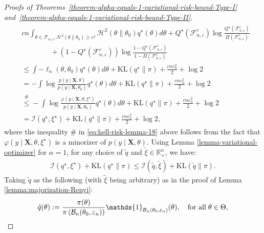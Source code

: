 \documentclass[12pt]{article}
\numberwithin{equation}{section}
\begin{document}
\begin{proof}[Proofs of Theorems~\ref{theorem-alpha-equals-1-variational-risk-bound-Type-I} and~\ref{theorem-alpha-equals-1-variational-risk-bound-Type-II}]
\begin{align}
\begin{split}
    &c n \int_{\theta \in \mathcal{F}_{n, \varepsilon}, \mathcal{H}^{2}(\theta \parallel \theta_0) \geq \varepsilon^2}\mathcal{H}^{2}(\theta\parallel \theta_0)q^{\star}(\theta)d\theta + Q^{\star}(\mathcal{F}_{n, \varepsilon}^{c})\log \frac{Q^{\star}(\mathcal{F}_{n, \varepsilon}^{c})}{\Pi(\mathcal{F}_{n, \varepsilon}^{c})}\\
    &\qquad \qquad + (1 - Q^{\star}(\mathcal{F}_{n, \varepsilon}^{c}))\log\frac{1 - Q^{\star}(\mathcal{F}_{n, \varepsilon}^{c})}{1 - \Pi(\mathcal{F}_{n, \varepsilon}^{c})}\\
    &\leq \int - \ell_{n}(\theta, \theta_0)q^{\star}(\theta)d\theta + \mathrm{KL}(q^{\star}\parallel \pi) + \frac{c n \varepsilon_n^2}{2} + \log 2\\
    &= -\int \log \frac{p(y\mid \mathbf{X}, \theta)}{p(y\mid \mathbf{X}, \theta_0)}q^{\star}(\theta)d\theta + \mathrm{KL}(q^{\star}\parallel \pi) + \frac{c n \varepsilon_n^2}{2} + \log 2\\
    &\stackrel{\#}{\leq} -\int \log \frac{\varphi(y\mid \mathbf{X}, \theta, \xi^{\star})}{p(y\mid \mathbf{X}, \theta_0)}q^{\star}(\theta)d\theta + \mathrm{KL}(q^{\star}\parallel \pi) + \frac{c n \varepsilon_n^2}{2} + \log 2\\
    &= \mathcal{I}(q^{\star}, \xi^{\star}) +\mathrm{KL}(q^{\star}\parallel \pi) + \frac{c n \varepsilon_n^2}{2} + \log 2,
\end{split}
\end{align}
where the inequality \# in \eqref{eq:hell-risk-lemma-18} above follows from the fact that $\varphi(y\mid \mathbf{X}, \theta, \xi^{\star})$ is a minorizer of $p(y\mid \mathbf{X}, \theta)$. Using Lemma \ref{lemma-variational-optimizer} for $\alpha = 1$, for any choice of $\tilde{q}$ and $\tilde{\xi} \in \mathbb{R}_{+}^n$, we have:
%
\begin{align}\label{eq:hell-risk-lemma-19}
\mathcal{I}(q^{\star}, \xi^{\star}) + \mathrm{KL}(q^{\star} \parallel \pi) \leq \mathcal{I}(\tilde{q}, \tilde{\xi}) + \mathrm{KL}(\tilde{q} \parallel \pi).   
\end{align}
%
Taking $\tilde{q}$ as the following (with $\tilde{\xi}$ being arbitrary) as in the proof of Lemma \ref{lemma:majorization-Renyi}:
%
\begin{align}\label{eq:hell-risk-lemma-20}
    \begin{split}
        \tilde{q}(\theta) := \frac{\pi(\theta)}{\pi\left(\mathcal{B}_n(\theta_0, \varepsilon_n)\right)}\mathds{1}_{\mathcal{B}_n(\theta_0, \varepsilon_n)}(\theta),\quad \text{for all}\hspace{1mm}\theta\in \Theta,

\end{split}
\end{align}
\end{proof}
\end{document}
